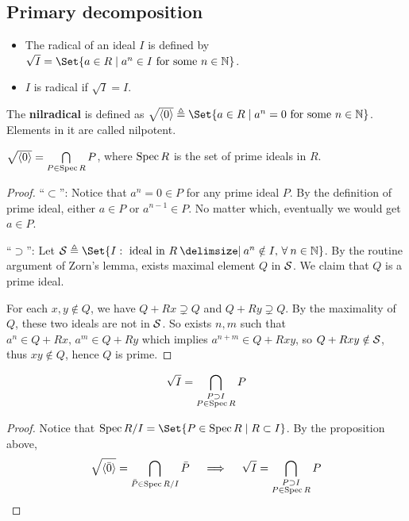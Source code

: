 \subsection{Primary decomposition}
\begin{definition} \hfill
  \begin{itemize}
    \item The radical of an ideal $I$ is defined by $\sqrt{I} =
      \Set{ a \in R \mid a^n \in I \text{ for some } n \in \Nb}$.
    \item $I$ is radical if $\sqrt{I} = I$.
  \end{itemize}
\end{definition}

\begin{definition}
  The {\bf nilradical} is defined as $\sqrt{\gen{0}} \triangleq
  \Set{ a \in R \mid a^n = 0 \text{ for some } n \in \Nb}$.
  Elements in it are called nilpotent.
\end{definition}

\begin{prop}
  $\sqrt{ \langle0\rangle } = \bigcap\limits_{P \in \operatorname{Spec} R} P$, where $\operatorname{Spec} R$ is the
  set of prime ideals in $R$.

  \begin{proof}
    ``$\subset$'': Notice that $a^n = 0 \in P$ for any prime ideal $P$. By the definition of
    prime ideal, either $a \in P$ or $a^{n-1} \in P$. No matter which, eventually we would get
    $a \in P$.

    ``$\supset$'':
    Let $\Sc \triangleq \Set{ I : \text{ ideal in } R \given a^n \notin I, \, \forall n \in \Nb}$.
    By the routine argument of Zorn's lemma, exists maximal element $Q$ in $\mathcal{S}$.
    We claim that $Q$ is a prime ideal.

    For each $x, y \notin Q$, we have $Q + Rx \supsetneq Q$ and $Q + Ry \supsetneq Q$.
    By the maximality of $Q$, these two ideals are not in $\mathcal{S}$.
    So exists $n, m$ such that $a^n \in Q + Rx,\, a^m \in Q + Ry$ which implies
    $a^{n+m} \in Q + Rxy$, so $Q + Rxy \notin \mathcal{S}$, thus $xy \notin Q$,
    hence $Q$ is prime.
  \end{proof}
\end{prop}

\begin{coro} \label{coro:equation-of-sqrt-ideal}
  \[ \sqrt{I} = \bigcap_{\substack{P \supset I \\ P \in \operatorname{Spec} R}} P \]

  \begin{proof}
    Notice that $\Spec \quot{R}{I} = \Set{P \in \Spec R \mid R \subset I}$.
    By the proposition above,
    \[
      \sqrt{\langle \bar0 \rangle} = \bigcap_{\bar{P} \in \operatorname{Spec} {R}/{I}} \bar{P}
      \quad \implies \quad \sqrt{I} = \bigcap_{\substack{P \supset I \\ P \in \operatorname{Spec} R}} P
      \qedhere
    \]
    \end{proof}
\end{coro}

